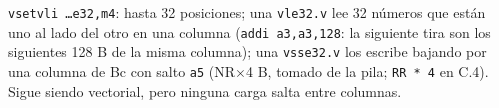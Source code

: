 \documentclass[10pt,a4paper]{article}
\begin{document}
\texttt{vsetvli \dots e32,m4}: hasta 32 posiciones; una \texttt{vle32.v} lee 32 números que están uno al lado del otro en una columna
(\texttt{addi a3,a3,128}: la siguiente tira son los siguientes 128 B de la misma columna); una \texttt{vsse32.v} los escribe bajando por
una columna de Bc con salto \texttt{a5} (NR$\times$4 B, tomado de la pila; \texttt{RR * 4} en C.4). Sigue siendo vectorial, pero ninguna
carga salta entre columnas.
\end{document}
